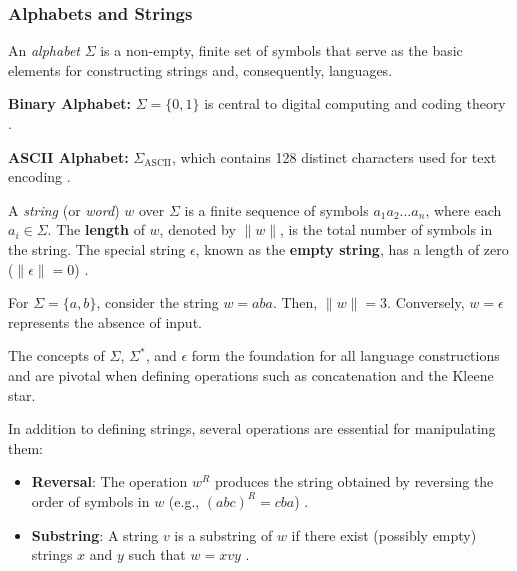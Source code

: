 \subsubsection{Alphabets and Strings}
\begin{definition}[Alphabet]
An \textit{alphabet} $\Sigma$ is a non-empty, finite set of symbols that serve as the basic elements for constructing strings and, consequently, languages.
\end{definition}

\begin{example}
\textbf{Binary Alphabet:} $\Sigma = \{0, 1\}$ is central to digital computing and coding theory \cite{sipser2013introduction}.
\end{example}

\begin{example}
\textbf{ASCII Alphabet:} $\Sigma_{\text{ASCII}}$, which contains 128 distinct characters used for text encoding \cite{cady1986ascii}.
\end{example}

\begin{definition}[String]
    A \textit{string} (or \textit{word}) $w$ over $\Sigma$ is a finite sequence of symbols $a_1a_2\ldots a_n$, where each $a_i \in \Sigma$. The \textbf{length} of $w$, denoted by $\|w\|$, is the total number of symbols in the string. The special string $\epsilon$, known as the \textbf{empty string}, has a length of zero ($\|\epsilon\| = 0$) \cite{sipser2013introduction}.
\end{definition}

\begin{example}
For $\Sigma = \{a, b\}$, consider the string $w = aba$. Then, $\|w\| = 3$. Conversely, $w = \epsilon$ represents the absence of input.
\end{example}

\begin{remark}
The concepts of $\Sigma$, $\Sigma^\ast$, and $\epsilon$ form the foundation for all language constructions and are pivotal when defining operations such as concatenation and the Kleene star.
\end{remark}

In addition to defining strings, several operations are essential for manipulating them:
\begin{itemize}
    \item \textbf{Reversal}: The operation $w^R$ produces the string obtained by reversing the order of symbols in $w$ (e.g., $(abc)^R = cba$) \cite{sipser2013introduction}.
    \item \textbf{Substring}: A string $v$ is a substring of $w$ if there exist (possibly empty) strings $x$ and $y$ such that $w = xvy$ \cite{sipser2013introduction}.
\end{itemize}

